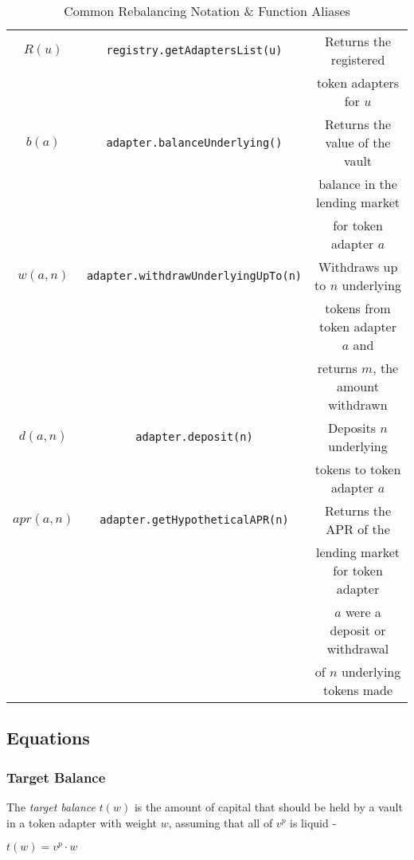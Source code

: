 \documentclass{article}
\begin{document}
\begin{table}[]
\begin{tabular}{|c|c|c|}
         \hline
         \hline
         $R(u)$ & \texttt{registry.getAdaptersList(u)} & Returns the registered\\
         & & token adapters for $u$\\
         \hline
        \texttt{$b(a)$} & \texttt{adapter.balanceUnderlying()} & Returns the value of the vault \\
        & & balance in the lending market \\
        & & for token adapter $a$\\
        \hline
        \texttt{$w(a, n)$} & \texttt{adapter.withdrawUnderlyingUpTo(n)} & Withdraws up to $n$ underlying \\
        & & tokens from token adapter $a$ and \\
        & & returns $m$, the amount withdrawn\\
        \hline
        \texttt{$d(a, n)$} & \texttt{adapter.deposit(n)} & Deposits $n$ underlying\\
        & & tokens to token adapter $a$\\
        \hline
        \texttt{$apr(a, n)$} & \texttt{adapter.getHypotheticalAPR(n)} & Returns the APR of the\\
        & &  lending market for token adapter\\
        &&  $a$ were a deposit or withdrawal\\
        &&  of $n$ underlying tokens made\\
        \hline
        
    \end{tabular}
    \caption{Common Rebalancing Notation \& Function Aliases}
    \label{table:defs}
\end{table}

\newpage
\subsection{Equations}

\subsubsection*{Target Balance}

The \textit{target balance} $t(w)$ is the amount of capital that should be held by a vault in a token adapter with weight $w$, assuming that all of $v^{p}$ is liquid -

\begin{center}
    $t(w) = v^{p} \cdot w$
\end{center}
\end{document}
